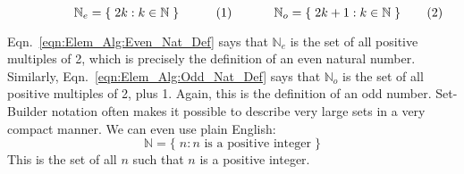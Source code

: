 \documentclass[crop=false,class=book,oneside]{standalone}
\begin{document}
            \begin{subequations}
                \begin{minipage}{0.49\textwidth}
                    \centering
                    \begin{equation}
                        \label{eqn:Elem_Alg:Even_Nat_Def}
                        \mathbb{N}_{e}=\{\;2k:k\in\mathbb{N}\;\}
                    \end{equation}
                \end{minipage}
                \hfill
                \begin{minipage}{0.49\textwidth}
                    \centering
                    \begin{equation}
                        \label{eqn:Elem_Alg:Odd_Nat_Def}
                        \mathbb{N}_{o}=\{\;2k+1:k\in\mathbb{N}\;\}
                    \end{equation}
                \end{minipage}
            \end{subequations}
            \par\vspace{2.5ex}
            Eqn.~\ref{eqn:Elem_Alg:Even_Nat_Def} says that
            $\mathbb{N}_{e}$ is the set of all positive
            multiples of 2, which is precisely the
            definition of an even natural number.
            Similarly, Eqn.~\ref{eqn:Elem_Alg:Odd_Nat_Def}
            says that $\mathbb{N}_{o}$ is the set of all
            positive multiples of 2, plus 1. Again, this is
            the definition of an odd number. Set-Builder
            notation often makes it possible to describe
            very large sets in a very compact manner.
            We can even use plain English:
            \begin{equation}
                \mathbb{N}=\{\;n:n\textrm{ is a positive integer}\;\}
            \end{equation}
            This is the set of all $n$ such that $n$ is a
            positive integer.
\end{document}
